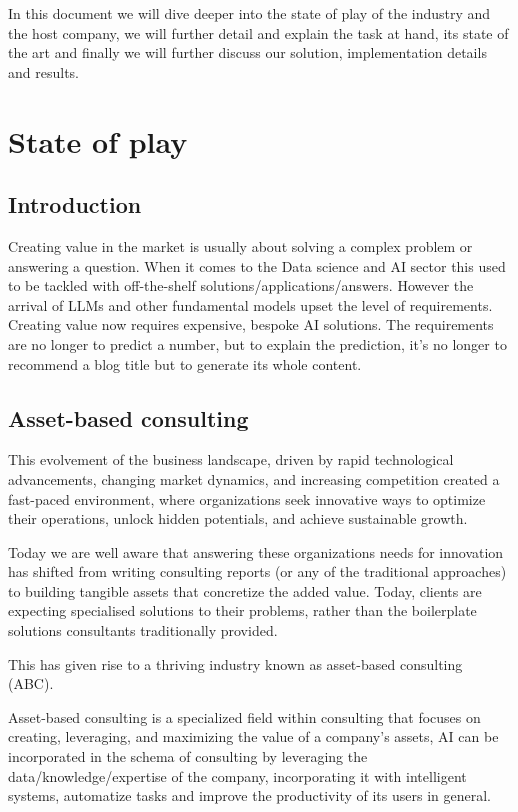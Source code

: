 \documentclass[a4paper,12pt]{article}
\begin{document}
In this document we will dive deeper into the state of play of the industry and the host company, 
we will further detail and explain the task at hand, its state of the art and finally we will further discuss our solution, implementation details and 
results.

\newpage

\section{State of play}
\subsection{Introduction}
Creating value in the market is usually about solving a complex problem or answering a question. When it comes to the Data science and AI sector this used to be tackled with off-the-shelf solutions/applications/answers.
However the arrival of LLMs and other fundamental models upset the level of requirements. Creating value now requires expensive,  bespoke AI solutions. 
The requirements are no longer to predict a number, but to explain the prediction, it's no longer to recommend a blog title but to generate its whole content.   

\subsection{Asset-based consulting}
This evolvement of the business landscape, driven by rapid technological advancements, changing market dynamics, and increasing competition created a fast-paced environment, where organizations seek innovative ways to optimize their operations, unlock hidden potentials, and achieve sustainable growth. 

Today we are well aware that answering these organizations needs for innovation has shifted from writing consulting reports (or any of the traditional approaches) to building tangible assets that concretize the added value. Today, clients are expecting specialised solutions to their problems, rather than the boilerplate solutions consultants traditionally provided.

This has given rise to a thriving industry known as asset-based consulting (ABC).

Asset-based consulting is a specialized field within consulting that focuses on creating, leveraging, and maximizing the value of a company's assets, 
AI can be incorporated in the schema of consulting by leveraging the data/knowledge/expertise of the company, incorporating it with intelligent systems, 
automatize tasks and improve the productivity of its users in general. 
\end{document}
